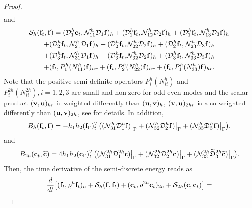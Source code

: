 \begin{proof}
\begin{multline*}
\end{multline*}
and 
\begin{multline*}
\mathcal{S}_{h}({\bf f}_t,{\bf f}) = (\mathcal{D}_1^{h}{\bf c}_t,\mathcal{N}_{11}^{h}\mathcal{D}_1{\bf f})_{h} +  (\mathcal{D}_1^{h}{\bf f}_t,\mathcal{N}_{12}^{h}\mathcal{D}_2{\bf f})_{h} +  (\mathcal{D}_1^{h}{\bf f}_t,\mathcal{N}_{13}^{h}\mathcal{D}_3{\bf f})_{h}\\
+  (\mathcal{D}_2^{h}{\bf f}_t,\mathcal{N}_{21}^{h}\mathcal{D}_1{\bf f})_{h} 
+  (\mathcal{D}_2^{h}{\bf f}_t,\mathcal{N}_{22}^{h}\mathcal{D}_2{\bf f})_{h} +  (\mathcal{D}_2^{h}{\bf f}_t,\mathcal{N}_{23}^{h}\mathcal{D}_3{\bf f})_{h} \\
+  (\mathcal{D}_3^{h}{\bf f}_t,\mathcal{N}_{31}^{h}\mathcal{D}_1{\bf f})_{h} 
+  (\mathcal{D}_3^{h}{\bf f}_t,\mathcal{N}_{32}^{h}\mathcal{D}_2{\bf f})_{h} +  (\mathcal{D}_3^{h}{\bf f}_t,\mathcal{N}_{33}^{h}\mathcal{D}_3{\bf f})_{h}\\
+ ({\bf f}_t, P^{h}_1(N_{11}^h){\bf f})_{hr} + ({\bf f}_t, P^{h}_2(N_{22}^h){\bf f})_{hr} + ({\bf f}_t, P^{h}_1(N_{33}^h){\bf f})_{hr}.
\end{multline*}
Note that the positive semi-definite operators $P_i^{h}(N_{ii}^{h})$ and $P_i^{2h}(N_{ii}^{2h}), i = 1,2,3$ are small and non-zero for odd-even modes and the scalar product $({\bf v}, {\bf u})_{hr}$ is weighted differently than $({\bf u}, {\bf v})_h$, $({\bf v}, {\bf u})_{2hr}$ is also weighted differently than $({\bf u}, {\bf v})_{2h}$, see \cite{sjogreen2012fourth, petersson2015wave} for details. In addition,
\begin{equation}\label{boundary_f}
B_h ({\bf f}_t,{\bf f}) = -h_1h_2({\bf f}_{\Gamma})_t^T\big((\mathcal{N}_{31}^h{\mathcal D}_1^h {\bf f})\big|_{\Gamma}+ (\mathcal{N}_{32}^h\mathcal{D}_2^h{\bf f})\big|_{\Gamma}+(\mathcal{N}_{33}^h\mathfrak{D}_3^h{\bf f})\big|_{\Gamma}\big),
\end{equation}
and
\begin{equation}\label{bounary_c}
B_{2h} ({\bf c}_t,\wt{\bf c}) = 4h_1h_2({\bf c}_{\Gamma})_t^T\big((\mathcal{N}_{31}^{2h}\mathcal{D}_1^{2h}{\bf c})\big|_{\Gamma}+ (\mathcal{N}_{32}^{2h}\mathcal{D}_2^{2h}{\bf c})\big|_{\Gamma}+(\mathcal{N}_{33}^{2h}\wt{\mathfrak{D}}_3^{2h}\wt{{\bf c}})\big|_{\Gamma}\big).
\end{equation}
Then, the time derivative of the semi-discrete energy reads as
\begin{multline}\label{semi_energy_1}
\frac{d}{dt}\big[({\bf f}_t,\varrho^h {\bf f}_t)_h + \mathcal{S}_{h}({\bf f},{\bf f}_t) + ({\bf c}_t,\varrho^{2h} {\bf c}_t)_{2h} + \mathcal{S}_{2h}({\bf c},{\bf c}_t) \big]  = \\

\end{multline}
\end{proof}
